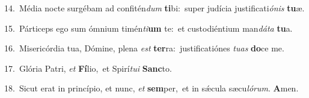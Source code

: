 {\numbfont\textcolor{\numbcolor}{14.}}~Média nocte surgébam ad confitén\textit{dum} \textbf{ti}\-bi:~\star super judícia justificati\-\textit{ó}\-\textit{nis} \textbf{tu}\-æ.\par
{\numbfont\textcolor{\numbcolor}{15.}}~Párticeps ego sum ómnium timén\-\textit{ti}\-\textbf{um} te:~\star et custodiéntium man\-\textit{dá}\-\textit{ta} \textbf{tu}\-a.\par
{\numbfont\textcolor{\numbcolor}{16.}}~Misericórdia tua, Dómine, plena \textit{est} \textbf{ter}\-ra:~\star justificatiónes \textit{tu}\-\textit{as} \textbf{do}\-ce me.\par
{\numbfont\textcolor{\numbcolor}{17.}}~Glória Patri, \textit{et} \textbf{Fí}\-lio,~\star et Spirí\-\textit{tu}\-\textit{i} \textbf{Sanc}\-to.\par
{\numbfont\textcolor{\numbcolor}{18.}}~Sicut erat in princípio, et nunc, \textit{et} \textbf{sem}\-per,~\star et in sǽcula sæcu\-\textit{ló}\-\textit{rum}. \textbf{A}\-men.\par
